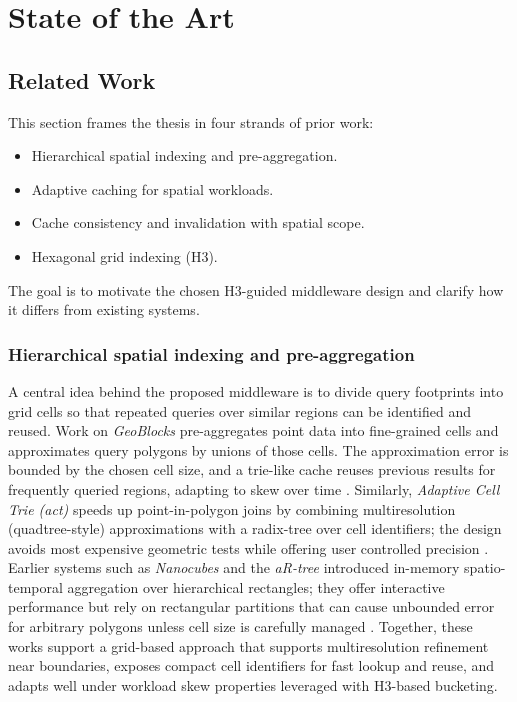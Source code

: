 \section{State of the Art}

\subsection{Related Work}
This section frames the thesis in four strands of prior work:
\begin{itemize}
  \item Hierarchical spatial indexing and pre-aggregation.
  \item Adaptive caching for spatial workloads.
  \item Cache consistency and invalidation with spatial scope.
  \item Hexagonal grid indexing (H3).
\end{itemize}

The goal is to motivate the chosen H3-guided middleware design and clarify how it differs from existing systems.

\subsubsection{Hierarchical spatial indexing and pre-aggregation}
A central idea behind the proposed middleware is to divide query footprints into grid cells so that repeated queries over similar regions can be identified and reused. Work on \emph{GeoBlocks} pre-aggregates point data into fine-grained cells and approximates query polygons by unions of those cells. The approximation error is bounded by the chosen cell size, and a trie-like cache reuses previous results for frequently queried regions, adapting to skew over time \cite{Winter2021_GeoBlocks}. Similarly, \emph{Adaptive Cell Trie (\ac{act})} speeds up point-in-polygon joins by combining multiresolution (quadtree-style) approximations with a radix-tree over cell identifiers; the design avoids most expensive geometric tests while offering user controlled precision \cite{Kipf2020_ACT}. Earlier systems such as \emph{Nanocubes} and the \emph{aR-tree} introduced in-memory spatio-temporal aggregation over hierarchical rectangles; they offer interactive performance but rely on rectangular partitions that can cause unbounded error for arbitrary polygons unless cell size is carefully managed \cite{Lins2013_Nanocubes,Papadias2001_aRtree}. Together, these works support a grid-based approach that supports multiresolution refinement near boundaries, exposes compact cell identifiers for fast lookup and reuse, and adapts well under workload skew properties leveraged with H3-based bucketing.

